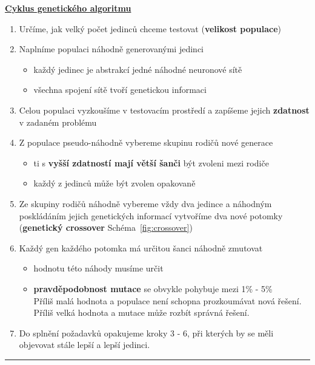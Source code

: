 \documentclass[a4paper,12pt]{article}
\begin{document}
        \underline{\textbf{\large{Cyklus genetického algoritmu}}}
        \begin{enumerate}[itemsep=-1.5mm] \item Určíme, jak velký počet jedinců chceme testovat (\textbf{velikost populace})
            \item Naplníme populaci náhodně generovanými jedinci
            \begin{itemize}[noitemsep]
                \item každý jedinec je abstrakcí jedné náhodné neuronové sítě
                \item všechna spojení sítě tvoří genetickou informaci
            \end{itemize}
            \item Celou populaci vyzkoušíme v testovacím prostředí a zapíšeme jejich \textbf{zdatnost} 
                v zadaném problému
            \item Z populace pseudo-náhodně vybereme skupinu rodičů nové generace 
            \begin{itemize}[noitemsep]
                \item ti s \textbf{vyšší zdatností mají větší šanči} být zvoleni mezi rodiče
                \item každý z jedinců může být zvolen opakovaně
            \end{itemize}
            \item Ze skupiny rodičů náhodně vybereme vždy dva jedince a náhodným poskládáním jejich
                genetických informací vytvoříme dva nové potomky (\textbf{genetický crossover} Schéma~\ref{fig:crossover})
            \item Každý gen každého potomka má určitou šanci náhodně zmutovat
            \begin{itemize}[noitemsep]
                \item hodnotu této náhody musíme určit
                \item \textbf{pravděpodobnost mutace} se obvykle pohybuje mezi 1\% - 5\%\\
                    Příliš malá hodnota a populace není schopna prozkoumávat nová řešení.
                    Příliš velká hodnota a mutace může rozbít správná řešení.

            \end{itemize}
            \item Do splnění požadavků opakujeme kroky 3 - 6, při kterých by se měli 
                objevovat stále lepší a lepší jedinci.
        \end{enumerate}
        \hrule
\end{document}
